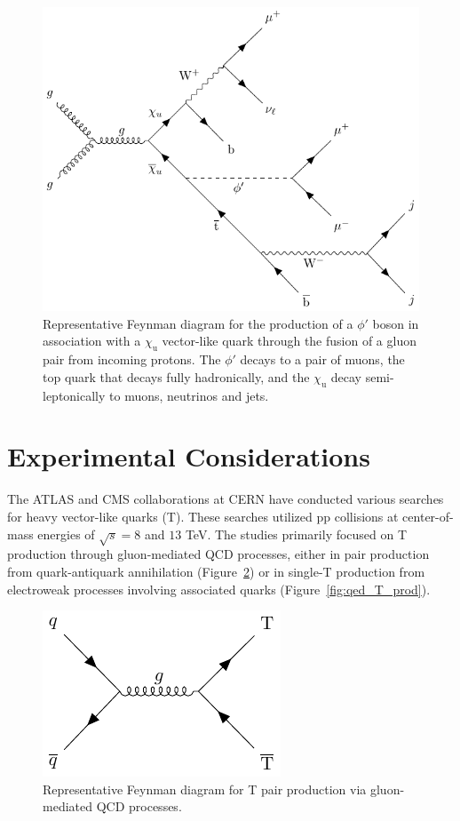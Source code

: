 \begin{figure}
    \centering
    \includegraphics[width=0.85\linewidth]{Images/signal_ggfusion.pdf}
    \caption{Representative Feynman diagram for the production of a $\phi'$ boson in association with a $\chi_\mathrm{u}$ vector-like quark through the fusion of a gluon pair from incoming protons. The $\phi'$ decays to a pair of muons, the top quark that decays fully hadronically, and the $\chi_\mathrm{u}$ decay semi-leptonically to muons, neutrinos and jets.\label{fig:ggfusion}}
\end{figure}

\section{Experimental Considerations}\label{sec:exp}

The ATLAS and CMS collaborations at CERN have conducted various searches for heavy vector-like quarks (T). These searches utilized $\mathrm{pp}$ collisions at center-of-mass energies of $\sqrt{s} = 8$ and $13$ \textrm{TeV}. The studies primarily focused on T production through gluon-mediated QCD processes, either in pair production from quark-antiquark annihilation (Figure~\ref{fig:qcd_T_prod}) or in single-T production from electroweak processes involving associated quarks (Figure~\ref{fig:qed_T_prod}). 

\begin{figure}
\centering
\includegraphics[width=0.6\linewidth]{Images/T_prod_qcd.pdf}
\caption{Representative Feynman diagram for T pair production via gluon-mediated QCD processes.\label{fig:qcd_T_prod}}
\end{figure}

